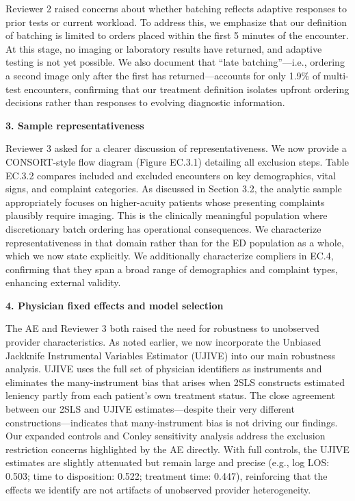 \documentclass[11pt]{article}
\newcommand{\1}{\hbox{\rm 1\kern-.35em 1}}
\begin{document}
Reviewer 2 raised concerns about whether batching reflects adaptive responses to prior tests or current workload. To address this, we emphasize that our definition of batching is limited to orders placed within the first 5 minutes of the encounter. At this stage, no imaging or laboratory results have returned, and adaptive testing is not yet possible. We also document that ``late batching''—i.e., ordering a second image only after the first has returned—accounts for only 1.9\% of multi-test encounters, confirming that our treatment definition isolates upfront ordering decisions rather than responses to evolving diagnostic information.

\textbf{3. Sample representativeness}

Reviewer 3 asked for a clearer discussion of representativeness. We now provide a CONSORT-style flow diagram (Figure EC.3.1) detailing all exclusion steps. Table EC.3.2 compares included and excluded encounters on key demographics, vital signs, and complaint categories. As discussed in Section 3.2, the analytic sample appropriately focuses on higher-acuity patients whose presenting complaints plausibly require imaging. This is the clinically meaningful population where discretionary batch ordering has operational consequences. We characterize representativeness in that domain rather than for the ED population as a whole, which we now state explicitly. We additionally characterize compliers in EC.4, confirming that they span a broad range of demographics and complaint types, enhancing external validity.

\textbf{4. Physician fixed effects and model selection}

The AE and Reviewer 3 both raised the need for robustness to unobserved provider characteristics. As noted earlier, we now incorporate the Unbiased Jackknife Instrumental Variables Estimator (UJIVE) into our main robustness analysis. UJIVE uses the full set of physician identifiers as instruments and eliminates the many-instrument bias that arises when 2SLS constructs estimated leniency partly from each patient's own treatment status. The close agreement between our 2SLS and UJIVE estimates—despite their very different constructions—indicates that many-instrument bias is not driving our findings. Our expanded controls and Conley sensitivity analysis address the exclusion restriction concerns highlighted by the AE directly. With full controls, the UJIVE estimates are slightly attenuated but remain large and precise (e.g., log LOS: 0.503; time to disposition: 0.522; treatment time: 0.447), reinforcing that the effects we identify are not artifacts of unobserved provider heterogeneity.
\end{document}
